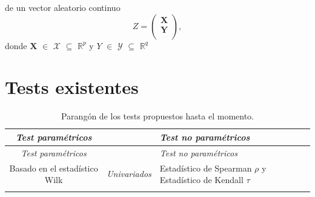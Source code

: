 \documentclass[]{book}
\begin{document}
de un vector aleatorio continuo \[ Z = \mathbf{\begin{pmatrix} X\\
Y\\
\end{pmatrix}},\] donde \(\mathbf{X}\) \(\in\) \(\mathcal{X}\)
\(\subseteq\) \(\mathbb{R}^p\) y \(Y\) \(\in\) \(\mathcal{Y}\)
\(\subseteq\) \(\mathbb{R}^q\)

\section{Tests existentes}\label{tests-existentes}

\begin{longtable}[]{@{}ccl@{}}
\caption{Parangón de los tests propuestos hasta el
momento.}\tabularnewline
\toprule
\begin{minipage}[b]{0.25\columnwidth}\centering\strut
\emph{Test paramétricos}\strut
\end{minipage} & \begin{minipage}[b]{0.10\columnwidth}\centering\strut
\strut
\end{minipage} & \begin{minipage}[b]{0.56\columnwidth}\raggedright\strut
\emph{Test no paramétricos}\strut
\end{minipage}\tabularnewline
\midrule
\endfirsthead
\toprule
\begin{minipage}[b]{0.25\columnwidth}\centering\strut
\emph{Test paramétricos}\strut
\end{minipage} & \begin{minipage}[b]{0.10\columnwidth}\centering\strut
\strut
\end{minipage} & \begin{minipage}[b]{0.56\columnwidth}\raggedright\strut
\emph{Test no paramétricos}\strut
\end{minipage}\tabularnewline
\midrule
\endhead
\begin{minipage}[t]{0.25\columnwidth}\centering\strut
Basado en el estadístico Wilk\strut
\end{minipage} & \begin{minipage}[t]{0.10\columnwidth}\centering\strut
\emph{\emph{Univariados}}\strut
\end{minipage} & \begin{minipage}[t]{0.56\columnwidth}\raggedright\strut
Estadístico de Spearman \(\rho\) y Estadístico de Kendall \(\tau\)\strut
\end{minipage}\tabularnewline
\begin{minipage}[t]{0.25\columnwidth}\centering\strut

\end{minipage}
\end{longtable}
\end{document}
